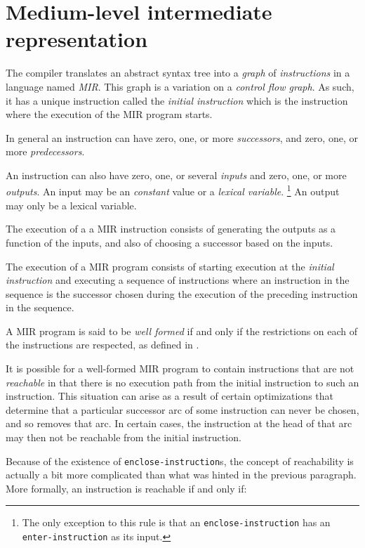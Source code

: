 \chapter{Medium-level intermediate representation}
\label{chap-mir}

The compiler translates an abstract syntax tree into a \emph{graph} of
\emph{instructions} in a language named \emph{MIR}.  This graph is a
variation on a \emph{control flow graph}.  As such, it has a unique
instruction called the \emph{initial instruction} which is the
instruction where the execution of the MIR program starts. 

In general an instruction can have zero, one, or more
\emph{successors}, and zero, one, or more \emph{predecessors}.

An instruction can also have zero, one, or several \emph{inputs} and
zero, one, or more \emph{outputs}.  An input may be an \emph{constant}
value or a \emph{lexical variable}.%
\footnote{The only exception to this rule is that an
  \texttt{enclose-instruction} has an \texttt{enter-instruction} as
  its input.}  An output may only be a lexical variable.

The execution of a a MIR instruction consists of generating the
outputs as a function of the inputs, and also of choosing a successor
based on the inputs.

The execution of a MIR program consists of starting execution at the
\emph{initial instruction} and executing a sequence of instructions
where an instruction in the sequence is the successor chosen during
the execution of the preceding instruction in the sequence.

A MIR program is said to be \emph{well formed} if and only if the
restrictions on each of the instructions are respected, as defined in
.

It is possible for a well-formed MIR program to contain instructions
that are not \emph{reachable} in that there is no execution path from
the initial instruction to such an instruction.  This situation can
arise as a result of certain optimizations that determine that a
particular successor arc of some instruction can never be chosen, and
so removes that arc.  In certain cases, the instruction at the head of
that arc may then not be reachable from the initial instruction.  

Because of the existence of \texttt{enclose-instruction}s, the concept
of reachability is actually a bit more complicated than what was
hinted in the previous paragraph.  More formally, an instruction is
reachable if and only if:

